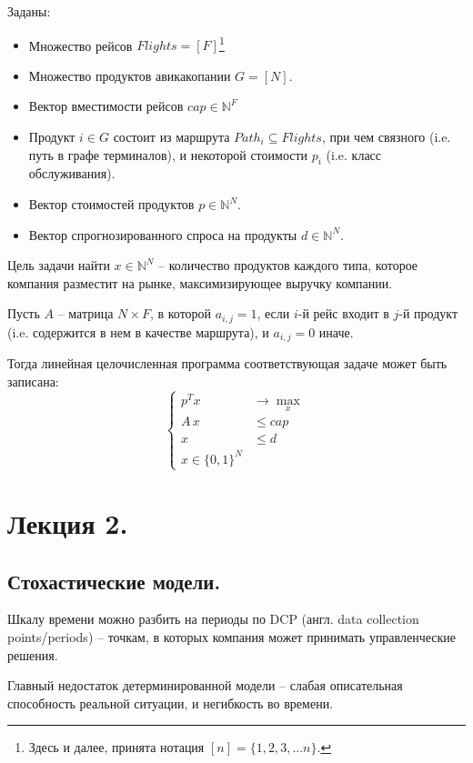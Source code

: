 \documentclass[reqno]{article}
\theoremstyle{definition}
\theoremstyle{definition}
\theoremstyle{definition}
\theoremstyle{definition}
\theoremstyle{definition}
\theoremstyle{definition}
\theoremstyle{definition}
\theoremstyle{definition}
\theoremstyle{definition}
\begin{document}
		Заданы:
		\begin{itemize}
			\item Множество рейсов $Flights = [F]$\footnote{Здесь и далее, принята нотация $[n] = \{1, 2, 3, ... n\}$.}
			\item Множество продуктов авикакопании $G = [N]$.
			\item Вектор вместимости рейсов $cap \in \mathds{N}^F$
			\item Продукт $i \in G$ состоит из маршрута $Path_i \subseteq Flights$, при чем связного (i.e. путь в графе терминалов), и некоторой стоимости $p_i$ (i.e. класс обслуживания).
			\item Вектор стоимостей продуктов $p \in \mathds{N}^N$.
			\item Вектор спрогнозированного спроса на продукты $d \in \mathds{N}^N$.
		
		\end{itemize}
	
		Цель задачи найти $x \in \mathds{N}^N$ -- количество продуктов каждого типа, которое компания разместит на рынке, максимизирующее выручку компании.
		
		Пусть $A$ -- матрица $N\times F$, в которой $a_{i, j} = 1$, если $i$-й рейс входит в $j$-й продукт (i.e. содержится в нем в качестве маршрута), и $a_{i, j} = 0$ иначе.
		
		Тогда линейная целочисленная программа соответствующая задаче может быть записана:
		$$
		\begin{cases}
			p^T x &\rightarrow \max_x\\
			A\,x  &\leq cap\\
			x     &\leq d\\
			x \in \{0, 1\}^N &
		\end{cases}
		$$
	
	\newpage
	\section{Лекция 2.}
		\subsection{Стохастические модели.}
		
		Шкалу времени можно разбить на периоды по DCP (англ. data collection points/periods) -- точкам, в которых компания может принимать управленческие решения.
		
		Главный недостаток детерминированной модели -- слабая описательная способность реальной ситуации, и негибкость во времени.
		
\end{document}
